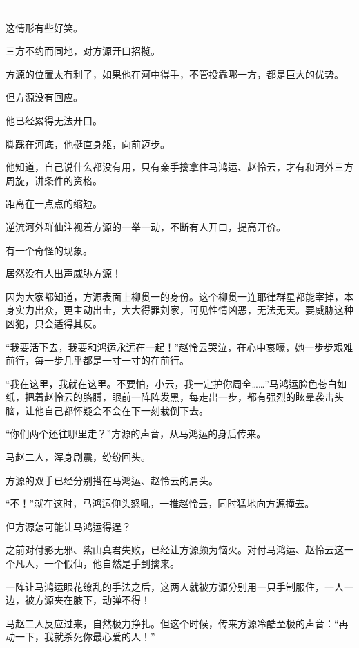
\begin{this_body}

------------

这情形有些好笑。

三方不约而同地，对方源开口招揽。

方源的位置太有利了，如果他在河中得手，不管投靠哪一方，都是巨大的优势。

但方源没有回应。

他已经累得无法开口。

脚踩在河底，他挺直身躯，向前迈步。

他知道，自己说什么都没有用，只有亲手擒拿住马鸿运、赵怜云，才有和河外三方周旋，讲条件的资格。

距离在一点点的缩短。

逆流河外群仙注视着方源的一举一动，不断有人开口，提高开价。

有一个奇怪的现象。

居然没有人出声威胁方源！

因为大家都知道，方源表面上柳贯一的身份。这个柳贯一连耶律群星都能宰掉，本身实力出众，更主动出击，大大得罪刘家，可见性情凶恶，无法无天。要威胁这种凶犯，只会适得其反。

“我要活下去，我要和鸿运永远在一起！”赵怜云哭泣，在心中哀嚎，她一步步艰难前行，每一步几乎都是一寸一寸的在前行。

“我在这里，我就在这里。不要怕，小云，我一定护你周全……”马鸿运脸色苍白如纸，把着赵怜云的胳膊，眼前一阵阵发黑，每走出一步，都有强烈的眩晕袭击头脑，让他自己都怀疑会不会在下一刻栽倒下去。

“你们两个还往哪里走？”方源的声音，从马鸿运的身后传来。

马赵二人，浑身剧震，纷纷回头。

方源的双手已经分别搭在马鸿运、赵怜云的肩头。

“不！”就在这时，马鸿运仰头怒吼，一推赵怜云，同时猛地向方源撞去。

但方源怎可能让马鸿运得逞？

之前对付影无邪、紫山真君失败，已经让方源颇为恼火。对付马鸿运、赵怜云这一个凡人，一个假仙，他自然是手到擒来。

一阵让马鸿运眼花缭乱的手法之后，这两人就被方源分别用一只手制服住，一人一边，被方源夹在腋下，动弹不得！

马赵二人反应过来，自然极力挣扎。但这个时候，传来方源冷酷至极的声音：“再动一下，我就杀死你最心爱的人！”


\end{this_body}
